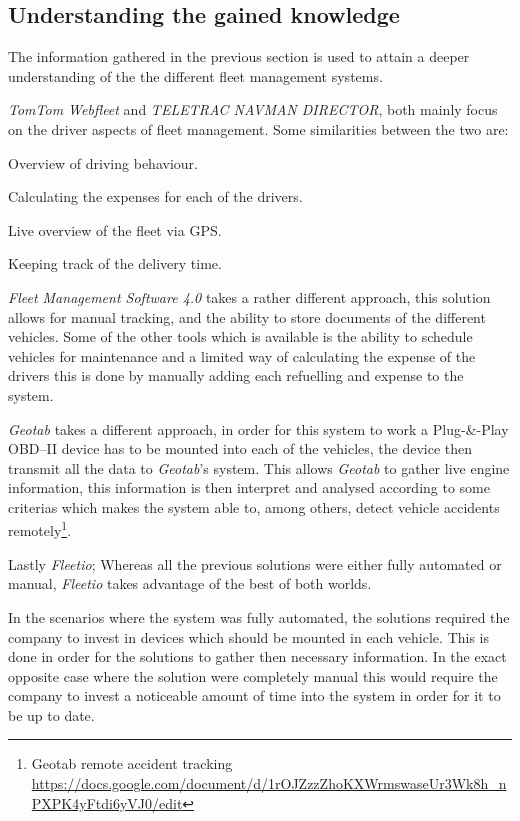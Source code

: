 \subsection{Understanding the gained knowledge}\label{sub:understanding}
The information gathered in the previous section is used to attain a deeper understanding of the the different fleet management systems.

\textit{TomTom Webfleet} and \textit{TELETRAC NAVMAN DIRECTOR}, both mainly focus on the driver aspects of fleet management.
Some similarities between the two are:
\begin{description}
    \item Overview of driving behaviour.
    \item Calculating the expenses for each of the drivers.
    \item Live overview of the fleet via GPS.
    \item Keeping track of the delivery time.
\end{description}

\textit{Fleet Management Software 4.0} takes a rather different approach, this solution allows for manual tracking, and the ability to store documents of the different vehicles.
Some of the other tools which is available is the ability to schedule vehicles for maintenance and a limited way of calculating the expense of the drivers this is done by manually adding each refuelling and expense to the system.

\textit{Geotab} takes a different approach, in order for this system to work a Plug-\&-Play OBD--II device has to be mounted into each of the vehicles, the device then transmit all the data to \textit{Geotab}'s system.
This allows \textit{Geotab} to gather live engine information, this information is then interpret and analysed according to some criterias which makes the system able to, among others, detect vehicle accidents remotely\footnote{Geotab remote accident tracking \url{https://docs.google.com/document/d/1rOJZzzZhoKXWrmswaseUr3Wk8h_nPXPK4yFtdi6yVJ0/edit}}.

Lastly \textit{Fleetio};
Whereas all the previous solutions were either fully automated or manual, \textit{Fleetio} takes advantage of the best of both worlds.

In the scenarios where the system was fully automated, the solutions required the company to invest in devices which should be mounted in each vehicle.
This is done in order for the solutions to gather then necessary information.
In the exact opposite case where the solution were completely manual this would require the company to invest a noticeable amount of time into the system in order for it to be up to date.

